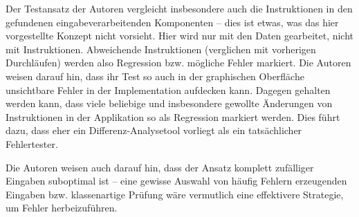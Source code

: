 Der Testansatz der Autoren vergleicht insbesondere auch die Instruktionen in den gefundenen
eingabeverarbeitenden Komponenten -- dies ist etwas, was das hier vorgestellte Konzept nicht
vorsieht. Hier wird nur mit den Daten gearbeitet, nicht mit Instruktionen. Abweichende
Instruktionen (verglichen mit vorherigen Durchläufen) werden also Regression bzw. mögliche Fehler markiert.
Die Autoren weisen darauf hin, dass ihr Test so auch in der graphischen Oberfläche
unsichtbare Fehler in der Implementation aufdecken kann. Dagegen gehalten werden kann,
dass viele beliebige und insbesondere gewollte Änderungen von Instruktionen in
der Applikation so als Regression markiert werden. Dies führt dazu, dass eher ein
Differenz-Analysetool vorliegt als ein tatsächlicher Fehlertester.

Die Autoren weisen auch darauf hin, dass der Ansatz komplett zufälliger Eingaben
suboptimal ist -- eine gewisse Auswahl von häufig Fehlern erzeugenden Eingaben
bzw. klassenartige Prüfung wäre vermutlich eine effektivere Strategie, um Fehler
herbeizuführen.
